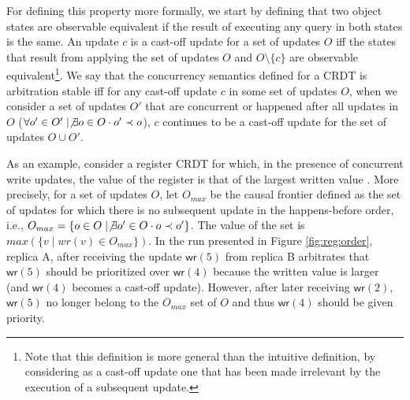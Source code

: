 \documentclass[11pt,a4paper]{article}
\begin{document}
For defining this property more formally, we start by defining that two object 
states are observable equivalent if the result of executing any query in both states
is the same. 
An update $c$ is a cast-off update for a set of updates $O$ iff 
the states that result from applying the set of updates $O$ and 
$O \setminus \{c\}$ are observable equivalent\footnote{Note that this definition 
is more general than the intuitive definition, by considering as a cast-off update
one that has been made irrelevant by the execution of a subsequent update.}.
We say that the concurrency semantics defined for a CRDT is arbitration stable 
iff for any cast-off update $c$ in some set of updates $O$, 
when we consider a set of updates $O'$ that are concurrent or happened after all 
updates in $O$ ($\forall o' \in O' \mid \not \exists o \in O \cdot o' \prec o$), $c$ continues to 
be a cast-off update for the set of updates $O \cup O'$.



As an example, consider a register CRDT for which, in the presence of concurrent write updates,
the value of the register is that of the largest written value \cite{Zawirski:2016:ECR:2911151.2911157}.
More precisely, for a set of updates $O$, let $O_{max}$ be the causal frontier 
defined as the set of updates 
for which there is no subsequent update in the happens-before order, i.e., 
$O_{max} =\{o \in O \mid \not \exists o' \in O \cdot o \prec o'\}$.
The value of the set is $max(\{ v \mid wr(v) \in O_{max}\})$.
In the run presented in Figure \ref{fig:reg:order}, replica A, after receiving
the update $\mathsf{wr}(5)$ from replica B arbitrates that $\mathsf{wr}(5)$ should
be prioritized over $\mathsf{wr}(4)$ because the written value is larger (and 
$\mathsf{wr}(4)$ becomes a cast-off update). 
However, after later receiving $\mathsf{wr}(2)$, $\mathsf{wr}(5)$ no longer belong 
to the $O_{max}$ set of $O$ and thus $\mathsf{wr}(4)$ should be given priority.
\end{document}

